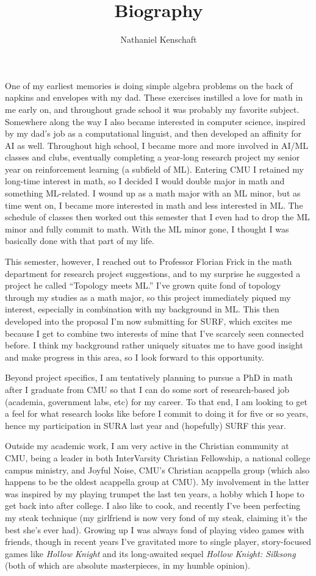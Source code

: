 \documentclass[12pt]{article}
\title{Biography}
\author{Nathaniel Kenschaft}
\date{}
\begin{document}
\maketitle

One of my earliest memories is doing simple algebra problems on the back of napkins and envelopes with my dad.
These exercises instilled a love for math in me early on, and throughout grade school it was probably my favorite subject.
Somewhere along the way I also became interested in computer science, inspired by my dad's job as a computational linguist, and then developed an affinity for AI as well.
Throughout high school, I became more and more involved in AI/ML classes and clubs, eventually completing a year-long research project my senior year on reinforcement learning (a subfield of ML).
Entering CMU I retained my long-time interest in math, so I decided I would double major in math and something ML-related.
I wound up as a  math major with an ML minor, but as time went on, I became more interested in math and less interested in ML.
The schedule of classes then worked out this semester that I even had to drop the ML minor and fully commit to math.
With the ML minor gone, I thought I was basically done with that part of my life.

This semester, however, I reached out to Professor Florian Frick in the math department for research project suggestions, and to my surprise he suggested a project he called ``Topology meets ML.''
I've grown quite fond of topology through my studies as a math major, so this project immediately piqued my interest, especially in combination with my background in ML.
This then developed into the proposal I'm now submitting for SURF, which excites me because I get to combine two interests of mine that I've scarcely seen connected before.
I think my background rather uniquely situates me to have good insight and make progress in this area, so I look forward to this opportunity.

Beyond project specifics, I am tentatively planning to pursue a PhD in math after I graduate from CMU so that I can do some sort of research-based job (academia, government labs, etc) for my career.
To that end, I am looking to get a feel for what research looks like before I commit to doing it for five or so years, hence my participation in SURA last year and (hopefully) SURF this year.

Outside my academic work, I am very active in the Christian community at CMU, being a leader in both InterVarsity Christian Fellowship, a national college campus ministry, and Joyful Noise, CMU's Christian acappella group (which also happens to be the oldest acappella group at CMU).
My involvement in the latter was inspired by my playing trumpet the last ten years, a hobby which I hope to get back into after college.
I also like to cook, and recently I've been perfecting my steak technique (my girlfriend is now very fond of my steak, claiming it's the best she's ever had).
Growing up I was always fond of playing video games with friends, though in recent years I've gravitated more to single player, story-focused games like \emph{Hollow Knight} and its long-awaited sequel \emph{Hollow Knight: Silksong} (both of which are absolute masterpieces, in my humble opinion).
\end{document}
